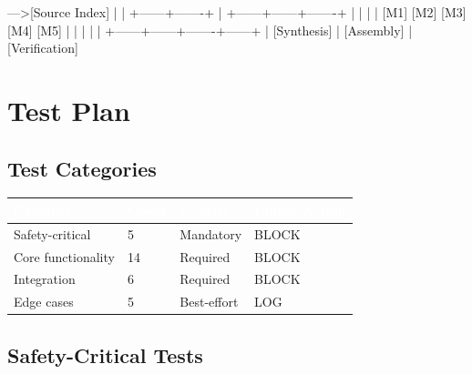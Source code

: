 \documentclass[11pt,letterpaper]{article}
\newcommand{\tableheader}[1]{\textbf{\sffamily\textcolor{white}{#1}}}
\begin{document}
\begin{asciibox}
[Schemas]--->[Source Index]
    |              |
    +------+-------+
           |
    +------+------+-------+
    |      |      |       |
   [M1]  [M2]  [M3]    [M4]   [M5]
    |      |      |       |      |
    +------+------+-------+------+
                  |
           [Synthesis]
                  |
           [Assembly]
                  |
         [Verification]
\end{asciibox}

\section{Test Plan}

\subsection{Test Categories}

\begin{center}
\begin{tabularx}{\textwidth}{L{3cm}C{1.5cm}C{1.5cm}C{2cm}}
\toprule
{}
\tableheader{Category} & \tableheader{Count} & \tableheader{Priority} & \tableheader{Failure Action} \\
\midrule
Safety-critical & 5 & Mandatory & BLOCK \\
Core functionality & 14 & Required & BLOCK \\
Integration & 6 & Required & BLOCK \\
Edge cases & 5 & Best-effort & LOG \\
\bottomrule
\end{tabularx}
\end{center}

\subsection{Safety-Critical Tests}
\end{document}
